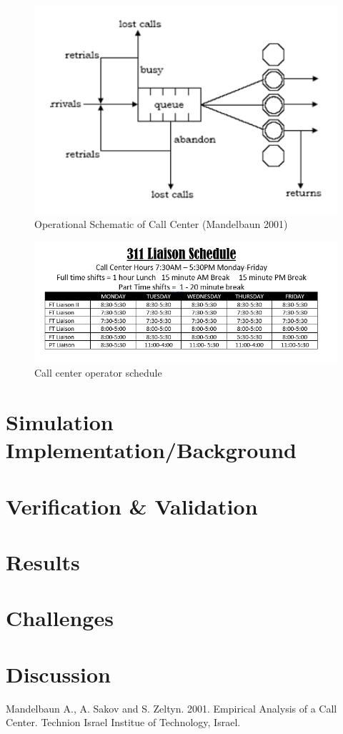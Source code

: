 \documentclass[11pt,twocolumn]{article}
\begin{document}
\begin{figure}[h]
	\includegraphics[scale=.45]{call_center_layout.png}
	\caption{Operational Schematic of Call Center (Mandelbaun 2001)}
\end{figure}

\begin{figure}[h]
	\includegraphics[scale=.35]{schedule2.jpg}
	\caption{Call center operator schedule}
\end{figure}

\section{Simulation Implementation/Background}



\section{Verification \& Validation}



\section{Results}



\section{Challenges}



\section{Discussion}



\begin{thebibliography}{7}

Mandelbaun A., A. Sakov and S. Zeltyn. 2001. Empirical Analysis of a Call Center. Technion Israel Institue of Technology, Israel.

\end{thebibliography}
\end{document}
